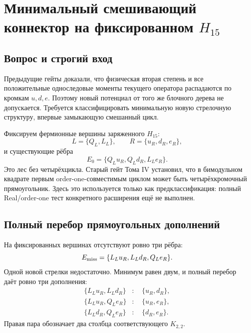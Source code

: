 \chapter{Минимальный смешивающий коннектор на фиксированном \texorpdfstring{$H_{15}$}{H15}}
\label{ch:v7-minimal-h15-mixed-connector-admission-gate}

\section{Вопрос и строгий вход}

Предыдущие гейты доказали, что физическая вторая степень и все положительные
односледовые моменты текущего оператора распадаются по кромкам $u,d,e$.
Поэтому новый потенциал от того же блочного дерева не допускается. Требуется
классифицировать минимальную новую стрелочную структуру, впервые замыкающую
смешанный цикл.

Фиксируем фермионные вершины заряженного $H_{15}$:
\begin{equation}
 L=\{Q_L,L_L\},\qquad R=\{u_R,d_R,e_R\},
\end{equation}
и существующие рёбра
\begin{equation}
 E_0=\{Q_Lu_R,Q_Ld_R,L_Le_R\}.
 \label{eq:v7-existing-h15-forest}
\end{equation}
Это лес без четырёхцикла. Старый гейт Тома IV установил, что в
бимодульном квадрате первым order-one-совместимым циклом может быть
четырёхкромочный прямоугольник. Здесь это используется только как
предклассификация: полный Real/order-one тест конкретного расширения ещё
не выполнен.

\section{Полный перебор прямоугольных дополнений}

На фиксированных вершинах отсутствуют ровно три рёбра:
\begin{equation}
 E_{\rm miss}=\{L_Lu_R,L_Ld_R,Q_Le_R\}.
\end{equation}
Одной новой стрелки недостаточно. Минимум равен двум, и полный перебор даёт
ровно три дополнения:
\begin{align}
 \{L_Lu_R,L_Ld_R\}&:\quad \{u_R,d_R\},\nonumber\\
 \{L_Lu_R,Q_Le_R\}&:\quad \{u_R,e_R\},
 \label{eq:v7-three-minimal-rectangles}\\
 \{L_Ld_R,Q_Le_R\}&:\quad \{d_R,e_R\}.\nonumber
\end{align}
Правая пара обозначает два столбца соответствующего $K_{2,2}$.

